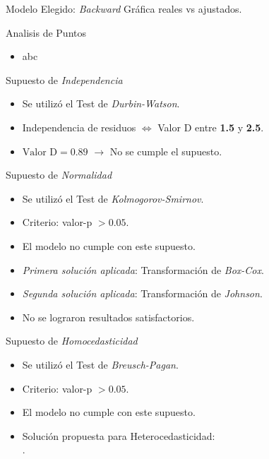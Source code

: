 \documentclass[11pt]{beamer}
\begin{document}
\begin{frame}{Modelo Elegido: \textit{Backward}}
Gráfica reales vs ajustados.
\end{frame}

\begin{frame}{Analisis de Puntos}
	\begin{itemize}
		\item abc
	\end{itemize}
\end{frame}

\begin{frame}{Supuesto de \textit{Independencia}}
	\begin{itemize}
		\item Se utilizó el Test de \textit{Durbin-Watson}.
		\pause
		\item Independencia de residuos $\Leftrightarrow$ Valor D entre \textbf{1.5} y \textbf{2.5}. 
		\pause
		\item $\text{Valor D} = \mathbf{0.89}$ $\to$ No se cumple el supuesto.
	\end{itemize}
\end{frame}

\begin{frame}{Supuesto de \textit{Normalidad}}
	\begin{itemize}
		\item Se utilizó el Test de \textit{Kolmogorov-Smirnov}.
		\pause
		\item Criterio: valor-p $>\mathbf{0.05}$.
		\pause
		\item El modelo no cumple con este supuesto.
		\pause
		\item \textit{Primera solución aplicada}: Transformación de \textit{Box-Cox}.
		\pause
		\item \textit{Segunda solución aplicada}: Transformación de \textit{Johnson}.
		\pause
		\item No se lograron resultados satisfactorios.
	\end{itemize}
\end{frame}

\begin{frame}{Supuesto de \textit{Homocedasticidad}}
	\begin{itemize}
		\item Se utilizó el Test de \textit{Breusch-Pagan}.
		\pause
		\item Criterio: valor-p $>\mathbf{0.05}$.
		\pause
		\item El modelo no cumple con este supuesto.
		\pause
		\item Solución propuesta para Heterocedasticidad: \\ .
	\end{itemize}
\end{frame}
\end{document}
